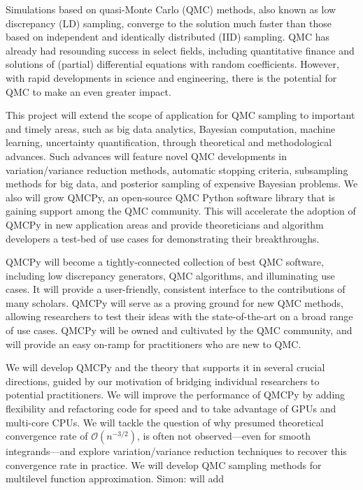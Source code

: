 \documentclass[11pt]{article}%
\newcommand{\SMNote}[1]{{\color{blue}Simon: #1}}
\begin{document}

\noindent Simulations based on quasi-Monte Carlo (QMC) methods, also known as low discrepancy (LD) sampling, converge to the solution much faster than those based on independent and identically distributed (IID) sampling.  QMC has already had resounding success in select fields, including quantitative finance and solutions of (partial) differential equations with random coefficients. However, with rapid developments in science and engineering, there is the potential for QMC to make an even greater impact.

This project will extend the scope of application for QMC sampling to important and timely areas, such as big data analytics, Bayesian computation, machine learning, uncertainty quantification, through theoretical and methodological advances. Such advances will feature novel QMC developments in variation/variance reduction methods, automatic stopping criteria, subsampling methods for big data, and posterior sampling of expensive Bayesian problems. We also will grow QMCPy, an open-source QMC Python software library that is gaining support among the QMC community. This will accelerate the adoption of QMCPy in new application areas and provide theoreticians and algorithm developers a test-bed of use cases for demonstrating their breakthroughs.

QMCPy will become a tightly-connected collection of best QMC software, including low discrepancy generators, QMC algorithms, and illuminating use cases. It will provide a user-friendly, consistent interface to the contributions of many scholars. QMCPy will serve as a proving ground for new QMC methods, allowing researchers to test their ideas with the state-of-the-art on a broad range of use cases. QMCPy will be owned and cultivated by the QMC community, and will provide an easy on-ramp for practitioners who are new to QMC.

\bigskip


\noindent We will develop QMCPy and the theory that supports it in several crucial directions, guided by our motivation of bridging individual researchers to potential practitioners. We will improve the performance of QMCPy by adding flexibility and refactoring code for speed and to take advantage of GPUs and multi-core CPUs.  We will tackle the question of why presumed theoretical convergence rate of $\mathcal{O}(n^{-3/2})$, is often not observed---even for smooth integrands---and explore variation/variance reduction techniques to recover this convergence rate in practice. We will develop QMC sampling methods for multilevel function approximation. \SMNote{will add}
\end{document}
